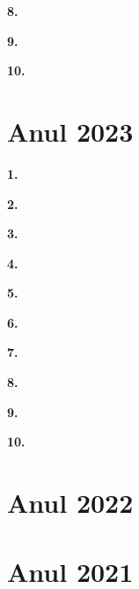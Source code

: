 \documentclass[11pt, a4paper]{article}
\begin{document}
\textbf{8.}\newline


\vspace{0.5cm}

\textbf{9.}\newline


\vspace{0.5cm}

\textbf{10.}\newline




\section{Anul 2023}
\textbf{1.}\newline


\vspace{0.5cm}

\textbf{2.}\newline


\vspace{0.5cm}

\textbf{3.}\newline


\vspace{0.5cm}

\textbf{4.}\newline


\vspace{0.5cm}

\textbf{5.}\newline


\vspace{0.5cm}

\textbf{6.}\newline


\vspace{0.5cm}

\textbf{7.}\newline


\vspace{0.5cm}

\textbf{8.}\newline


\vspace{0.5cm}

\textbf{9.}\newline


\vspace{0.5cm}

\textbf{10.}\newline



\section{Anul 2022}


\section{Anul 2021}

\end{document}
